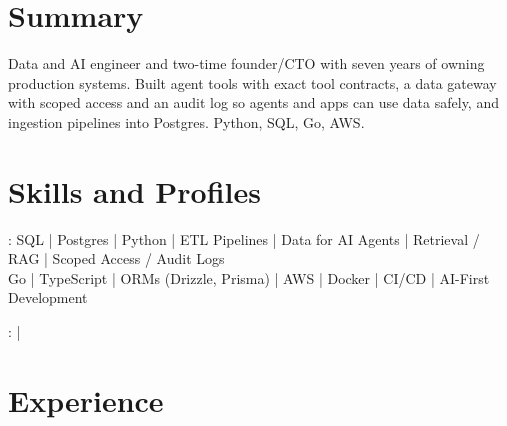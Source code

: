 \documentclass[print]{jack-resume}
\begin{document}
\pagecolor{darkmodeBackground}


\begin{minipage}[t][1cm][t]{.03\textwidth}
    \hfill
\end{minipage}

\section{Summary}
Data and AI engineer and two-time founder/CTO with seven years of owning production systems. Built agent tools with exact tool contracts, a data gateway with scoped access and an audit log so agents and apps can use data safely, and ingestion pipelines into Postgres. Python, SQL, Go, AWS.
\sectionsep

\section{Skills and Profiles}
:
SQL \hfill | \hfill
Postgres \hfill | \hfill
Python \hfill | \hfill
ETL Pipelines \hfill | \hfill
Data for AI Agents \hfill | \hfill
Retrieval / RAG \hfill | \hfill
Scoped Access / Audit Logs \\
\hspace{1.0cm} Go \hfill | \hfill
TypeScript \hfill | \hfill
ORMs (Drizzle, Prisma) \hfill | \hfill
AWS \hfill | \hfill
Docker \hfill | \hfill
CI/CD \hfill | \hfill
AI-First Development \\

\raggedright{
    :
      \href{https://www.linkedin.com/in/jack-sturtevant/}{ \ExternalLink} |
     \href{https://github.com/jacksturt}{ \ExternalLink}}

\section{Experience}
\end{document}
